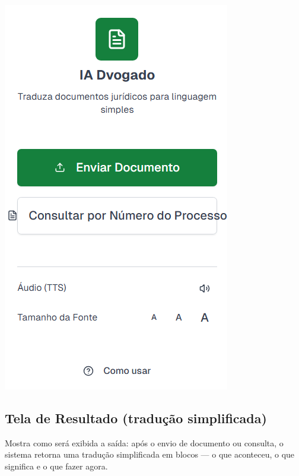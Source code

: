 \documentclass{article}
\begin{document}
\includegraphics{images/488854265-1f3c3198-5f5b-492a-85b2-fcf826105ffa.png}

\subsection*{Tela de Resultado (tradução simplificada)}
Mostra como será exibida a saída: após o envio de documento ou consulta, o sistema retorna uma tradução simplificada em blocos — o que aconteceu, o que significa e o que fazer agora.
\end{document}
